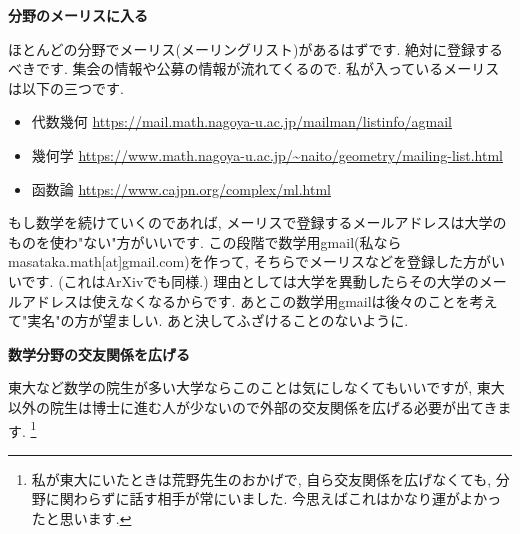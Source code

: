 \textbf{分野のメーリスに入る}  　\vspace{-6pt} 

ほとんどの分野でメーリス(メーリングリスト)があるはずです. 
絶対に登録するべきです. 集会の情報や公募の情報が流れてくるので. 
私が入っているメーリスは以下の三つです.

\begin{itemize}[left=0pt]
  \setlength{\parskip}{0cm} %
  \setlength{\itemsep}{0cm} %
\item 代数幾何 \url{https://mail.math.nagoya-u.ac.jp/mailman/listinfo/agmail}
\item 幾何学 \url{https://www.math.nagoya-u.ac.jp/~naito/geometry/mailing-list.html}
\item 函数論 \url{https://www.cajpn.org/complex/ml.html}
\end{itemize}

もし数学を続けていくのであれば, メーリスで登録するメールアドレスは大学のものを使わ"ない"方がいいです. 
この段階で数学用gmail(私ならmasataka.math[at]gmail.com)を作って, そちらでメーリスなどを登録した方がいいです. (これはArXivでも同様.)
理由としては大学を異動したらその大学のメールアドレスは使えなくなるからです. 
あとこの数学用gmailは後々のことを考えて"実名"の方が望ましい. あと決してふざけることのないように.
\vspace{8pt} 

\textbf{数学分野の交友関係を広げる}  　\vspace{-6pt} 

東大など数学の院生が多い大学ならこのことは気にしなくてもいいですが, 東大以外の院生は博士に進む人が少ないので外部の交友関係を広げる必要が出てきます. \footnote{私が東大にいたときは荒野先生のおかげで, 自ら交友関係を広げなくても, 分野に関わらずに話す相手が常にいました. 今思えばこれはかなり運がよかったと思います.} 

